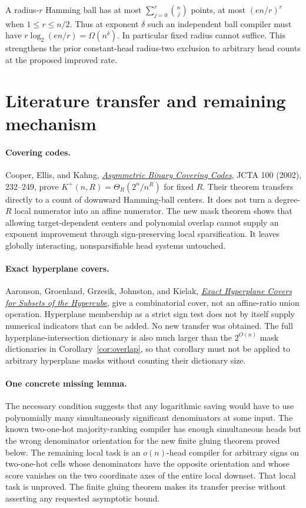 \documentclass[11pt]{article}
\begin{document}
A radius-$r$ Hamming ball has at most $\sum_{j=0}^r\binom nj$
points, at most $(en/r)^r$ when $1\leq r\leq n/2$.
Thus at exponent $\delta$ such an independent ball compiler must have
$r\log_2(en/r)=\Omega(n^\delta)$. In particular fixed radius cannot
suffice. This strengthens the prior constant-head radius-two exclusion
to arbitrary head counts at the proposed improved rate.

\section{Literature transfer and remaining mechanism}

\paragraph{Covering codes.}
Cooper, Ellis, and Kahng,
\href{https://math.iit.edu/~rellis/papers/3asy_short.pdf}
{\emph{Asymmetric Binary Covering Codes}}, JCTA 100 (2002), 232--249,
prove $K^+(n,R)=\Theta_R(2^n/n^R)$ for fixed $R$.
Their theorem transfers directly to a count of downward Hamming-ball
centers. It does not turn a degree-$R$ local numerator into an affine
numerator. The new mask theorem shows that allowing target-dependent
centers and polynomial overlap cannot supply an exponent improvement
through sign-preserving local sparsification. It leaves globally
interacting, nonsparsifiable head systems untouched.

\paragraph{Exact hyperplane covers.}
Aaronson, Groenland, Grzesik, Johnston, and Kielak,
\href{https://arxiv.org/abs/2010.00315}
{\emph{Exact Hyperplane Covers for Subsets of the Hypercube}},
give a combinatorial cover, not an affine-ratio union operation.
Hyperplane membership as a strict sign test does not by itself supply
numerical indicators that can be added. No new transfer was obtained.
The full hyperplane-intersection dictionary is also much larger than
the $2^{O(n)}$ mask dictionaries in Corollary~\ref{cor:overlap}, so that
corollary must not be applied to arbitrary hyperplane masks without
counting their dictionary size.

\paragraph{One concrete missing lemma.}
The necessary condition suggests that any logarithmic saving would
have to use polynomially many simultaneously significant denominators
at some input. The known two-one-hot majority-ranking compiler has
enough simultaneous heads but the wrong denominator orientation for
the new finite gluing theorem proved below. The remaining local task
is an $o(n)$-head compiler for arbitrary signs on two-one-hot cells
whose denominators have the opposite orientation and whose score
vanishes on the two coordinate axes of the entire local downset.
That local task is unproved. The finite gluing theorem makes its
transfer precise without asserting any requested asymptotic bound.
\end{document}

